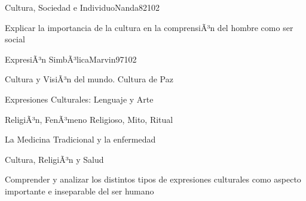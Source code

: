 \begin{syllabus}
\begin{unit}{Cultura, Sociedad e Individuo}{Nanda82}{10}{2}
   \begin{unitgoals}
      \item Explicar la importancia de la cultura en la comprensiÃ³n del hombre como ser social
   \end{unitgoals}
\end{unit}

\begin{unit}{ExpresiÃ³n SimbÃ³lica}{Marvin97}{10}{2}
   \begin{topics}
      \item Cultura y VisiÃ³n del mundo. Cultura de Paz
	\item Expresiones Culturales: Lenguaje y Arte
	\item ReligiÃ³n, FenÃ³meno Religioso, Mito, Ritual
	\item La Medicina Tradicional y la enfermedad
	\item Cultura, ReligiÃ³n y Salud
   \end{topics}

   \begin{unitgoals}
      \item Comprender y analizar los distintos tipos de expresiones culturales como aspecto importante e inseparable del ser humano
   \end{unitgoals}
\end{unit}

\begin{coursebibliography}
\end{coursebibliography}
\end{syllabus}
